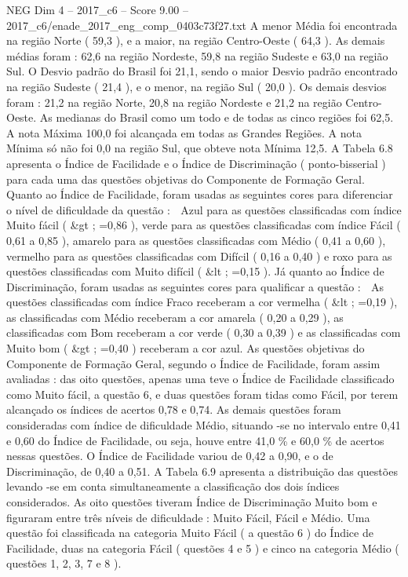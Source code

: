 \begin{textsample}{NEG Dim 4 – 2017\_c6 – Score 9.00 – 2017\_c6/enade\_2017\_eng\_comp\_0403c73f27.txt}
A menor Média foi encontrada na região Norte ( 59,3 ), e a maior, na região Centro-Oeste ( 64,3 ).
As demais médias foram : 62,6 na região Nordeste, 59,8 na região Sudeste e 63,0 na região Sul.
O Desvio padrão do Brasil foi 21,1, sendo o maior Desvio padrão encontrado na região Sudeste ( 21,4 ), e o menor, na região Sul ( 20,0 ).
Os demais desvios foram : 21,2 na região Norte, 20,8 na região Nordeste e 21,2 na região Centro-Oeste.
As medianas do Brasil como um todo e de todas as cinco regiões foi 62,5.
A nota Máxima 100,0 foi alcançada em todas as Grandes Regiões.
A nota Mínima só não foi 0,0 na região Sul, que obteve nota Mínima 12,5.
A Tabela 6.8 apresenta o Índice de Facilidade e o Índice de Discriminação ( ponto-bisserial ) para cada uma das questões objetivas do Componente de Formação Geral.
Quanto ao Índice de Facilidade, foram usadas as seguintes cores para diferenciar o nível de dificuldade da questão :  Azul para as questões classificadas com índice Muito fácil ( \&gt ; =0,86 ), verde para as questões classificadas com índice Fácil ( 0,61 a 0,85 ), amarelo para as questões classificadas com Médio ( 0,41 a 0,60 ), vermelho para as questões classificadas com Difícil ( 0,16 a 0,40 ) e roxo para as questões classificadas com Muito difícil ( \&lt ; =0,15 ).
Já quanto ao Índice de Discriminação, foram usadas as seguintes cores para qualificar a questão :  As questões classificadas com índice Fraco receberam a cor vermelha ( \&lt ; =0,19 ), as classificadas com Médio receberam a cor amarela ( 0,20 a 0,29 ), as classificadas com Bom receberam a cor verde ( 0,30 a 0,39 ) e as classificadas com Muito bom ( \&gt ; =0,40 ) receberam a cor azul.
As questões objetivas do Componente de Formação Geral, segundo o Índice de Facilidade, foram assim avaliadas : das oito questões, apenas uma teve o Índice de Facilidade classificado como Muito fácil, a questão 6, e duas questões foram tidas como Fácil, por terem alcançado os índices de acertos 0,78 e 0,74.
As demais questões foram consideradas com índice de dificuldade Médio, situando -se no intervalo entre 0,41 e 0,60 do Índice de Facilidade, ou seja, houve entre 41,0 \% e 60,0 \% de acertos nessas questões.
O Índice de Facilidade variou de 0,42 a 0,90, e o de Discriminação, de 0,40 a 0,51.
A Tabela 6.9 apresenta a distribuição das questões levando -se em conta simultaneamente a classificação dos dois índices considerados.
As oito questões tiveram Índice de Discriminação Muito bom e figuraram entre três níveis de dificuldade : Muito Fácil, Fácil e Médio.
Uma questão foi classificada na categoria Muito Fácil ( a questão 6 ) do Índice de Facilidade, duas na categoria Fácil ( questões 4 e 5 ) e cinco na categoria Médio ( questões 1, 2, 3, 7 e 8 ).

\end{textsample}
